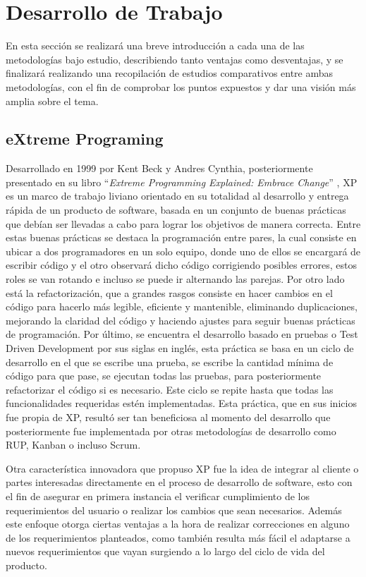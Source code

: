 \documentclass[a4paper,10pt]{article}
\begin{document}
	\section{Desarrollo de Trabajo}
	En esta sección se realizará una breve introducción a cada una de las metodologías bajo estudio, describiendo tanto ventajas como desventajas, y se finalizará realizando una recopilación de estudios comparativos entre ambas metodologías, con el fin de comprobar los puntos expuestos y dar una visión más amplia sobre el tema.
	\subsection{eXtreme Programing}
	Desarrollado en 1999 por Kent Beck y Andres Cynthia, posteriormente presentado en su libro “\textit{Extreme Programming Explained: Embrace Change}” \parencite{Beck_Andres_2005}, XP es un marco de trabajo liviano orientado en su totalidad al desarrollo y entrega rápida de un producto de software, basada en un conjunto de buenas prácticas que debían ser llevadas a cabo para lograr los objetivos de manera correcta. Entre estas buenas prácticas se destaca la programación entre pares, la cual consiste en ubicar a dos programadores en un solo equipo, donde uno de ellos se encargará de escribir código y el otro observará dicho código corrigiendo posibles errores, estos roles se van rotando e incluso se puede ir alternando las parejas. Por otro lado está la refactorización, que a grandes rasgos consiste en hacer cambios en el código para hacerlo más legible, eficiente y mantenible, eliminando duplicaciones, mejorando la claridad del código y haciendo ajustes para seguir buenas prácticas de programación. Por último, se encuentra el desarrollo basado en pruebas o Test Driven Development \parencite{Beck_2003} por sus siglas en inglés, esta práctica se basa en un ciclo de desarrollo en el que se escribe una prueba, se escribe la cantidad mínima de código para que pase, se ejecutan todas las pruebas, para posteriormente refactorizar el código si es necesario. Este ciclo se repite hasta que todas las funcionalidades requeridas estén implementadas. Esta práctica, que en sus inicios fue propia de XP, resultó ser tan beneficiosa al momento del desarrollo que posteriormente fue implementada por otras metodologías de desarrollo como RUP, Kanban o incluso Scrum.
	
	Otra característica innovadora que propuso XP fue la idea de integrar al cliente o partes interesadas directamente en el proceso de desarrollo de software, esto con el fin de asegurar en primera instancia el verificar cumplimiento de los requerimientos del usuario o realizar los cambios que sean necesarios. Además este enfoque otorga ciertas ventajas a la hora de realizar correcciones en alguno de los requerimientos planteados, como también resulta más fácil el adaptarse a nuevos requerimientos que vayan surgiendo a lo largo del ciclo de vida del producto.
	
\end{document}
